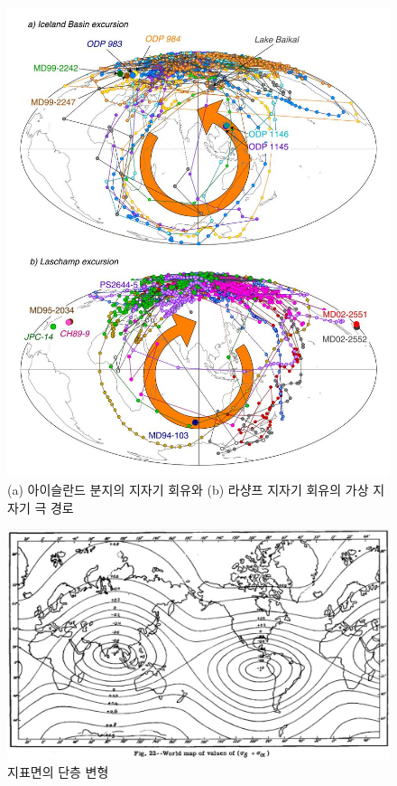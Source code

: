 \documentclass[10pt,twocolumn,letterpaper]{article}
\begin{document}
\begin{figure}[t]
\begin{center}
   \includegraphics[width=0.95\linewidth]{laj.jpg}
\end{center}
   \caption{(a) 아이슬란드 분지의 지자기 회유와 (b) 라샹프 지자기 회유의 가상 지자기 극 경로 \cite{35}}
\label{fig:7}
\label{fig:onecol}
\end{figure}

\begin{figure}[t]
\begin{center}
   \includegraphics[width=1\linewidth]{meinesz3.jpg}
\end{center}
   \caption{지표면의 단층 변형  \cite{36}}
\label{fig:8}
\label{fig:onecol}
\end{figure}
\end{document}
